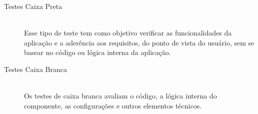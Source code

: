 
\begin{description}
\item[Testes Caixa Preta] \hfill \\

Esse tipo de teste tem como objetivo verificar as funcionalidades da aplicação e a aderência aos requisitos, do ponto de vista do usuário, sem se basear no código ou lógica interna da aplicação.

\item[Testes Caixa Branca] \hfill \\

Os testes de caixa branca avaliam o código, a lógica interna do componente, as configurações e outros elementos técnicos.
\end{description}


